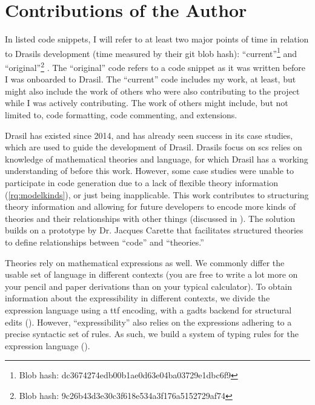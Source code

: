 \section{Contributions of the Author}
\label{sec:intro:contributions}

In listed code snippets, I will refer to at least two major points of time in
relation to Drasils development (time measured by their git blob hash):
``current''\footnote{Blob hash: dc3674274edb00b1ae0d63e04ba03729e1dbc6f9} and
``original''\footnote{Blob hash: 9c26b43d3e30c3f618e534a3f176a5152729af74}
. The ``original'' code refers
to a code snippet as it was written before I was onboarded to Drasil. The
``current'' code includes my work, at least, but might also include the work of
others who were also contributing to the project while I was actively
contributing. The work of others might include, but not limited to, code
formatting, code commenting, and extensions.

Drasil has existed since 2014, and has already seen success in its case studies,
which are used to guide the development of Drasil. Drasils focus on \acs{scs}
relies on knowledge of mathematical theories and language, for which Drasil has
a working understanding of before this work. However, some case studies were
unable to participate in code generation due to a lack of flexible theory
information (\ref{rq:modelkinds}), or just being inapplicable. This work
contributes to structuring theory information and allowing for future developers
to encode more kinds of theories and their relationships with other things
(discussed in ). The solution builds on a prototype by Dr.
Jacques Carette that
facilitates structured theories to define relationships between ``code'' and
``theories.''

Theories rely on mathematical expressions as well. We commonly differ the usable
set of language in different contexts (you are free to write a lot more on your
pencil and paper derivations than on your typical calculator). To obtain
information about the expressibility in different contexts, we divide the
expression language using a \acs{ttf} \cite{Carette2009} encoding, with a
\acsp{gadt} backend for structural edits (). However,
``expressibility'' also relies on the expressions adhering to a precise
syntactic set of rules. As such, we build a system of typing rules for the
expression language ().

